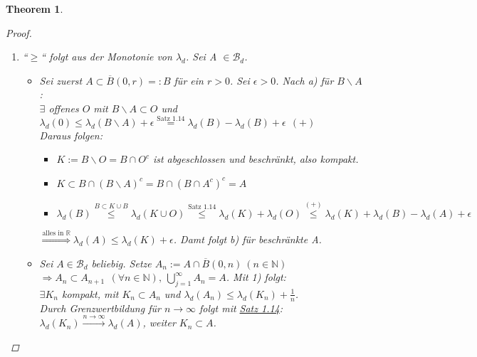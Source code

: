 \documentclass[a4paper]{scrreprt}
\newcommand{\R}{\mathbb{R}}
\newcommand{\N}{\mathbb{N}}
\newcommand{\Borel}{\mathcal{B}}
\newcommand{\Bd}{\Borel_d}
\newcommand{\jshortlink}[1]{\jhyperref{#1}{\text{#1}}}
\newcommand{\jhyperref}[2]{\hyperref[j_#1]{#2}}
\newcommand{\jlink}[1]{\jhyperref{#1}{#1}}
\theoremstyle{plain}
\newtheorem{thm}{Theorem}[chapter]
\theoremstyle{definition}
\begin{document}
{{{\begin{thm}
\begin{proof}
\begin{enumerate}
            \item
                ``$\ge$`` folgt aus der Monotonie von $\lambda_d$. Sei A $\in \Bd$.
                    \begin{itemize}
                        \item[1)]
                            Sei zuerst $A\subset \overline{B}(0,r) =: B$ für ein $r>0$. Sei $\epsilon > 0$. Nach a) für $B\backslash A$:\\ 
                            $\exists$ offenes $O$ mit $B\backslash A \subset O$ und $\lambda_d(0) \le \lambda_d(B\backslash A) + \epsilon \overset{\jshortlink{Satz 1.14}}{=} \lambda_d(B) - \lambda_d(B) + \epsilon \ \ (+)$\\
                            Daraus folgen:
                            \begin{itemize}
                                \item $K := B\backslash O = B \cap O^c$ ist abgeschlossen und beschränkt, also kompakt.
                                \item $K \subset B \cap (B\backslash A)^c = B \cap (B\cap A^c)^c = A$
                                \item $\lambda_d(B) \overset{B \subset K\cup B}{\le} \lambda_d(K \cup O) \overset{\jshortlink{Satz 1.14}}{\le} \lambda_d(K) + \lambda_d(O) \overset{(+)}{\le} \lambda_d(K) + \lambda_d(B) - \lambda_d(A) + \epsilon$
                            \end{itemize}
                            $\overset{\text{alles in } \R}{\Rightarrow} \lambda_d(A) \le \lambda_d(K) + \epsilon$. Damt folgt b) für beschränkte A.
                        
                        \item[2)]
                            Sei $A\in \Bd$ beliebig. Setze $A_n := A\cap \overline{B}(0,n) \ (n\in\N)$\\
                            $\Rightarrow A_n \subset A_{n+1} \ \ (\forall n\in\N),\ \bigcup_{j=1}^\infty A_n = A$. Mit 1) folgt:\\
                            $\exists K_n$ kompakt, mit $K_n\subset A_n$ und $\lambda_d(A_n) \le \lambda_d(K_n) + \frac{1}{n}$.\\
                            Durch Grenzwertbildung für $n\rightarrow \infty$ folgt mit \jlink{Satz 1.14}:\\
                            $\lambda_d(K_n) \xrightarrow{n \rightarrow \infty} \lambda_d(A)$, weiter $K_n \subset A$.
                    \end{itemize}
         \end{enumerate}
    \end{proof}
\end{thm}

}}}
\end{document}
